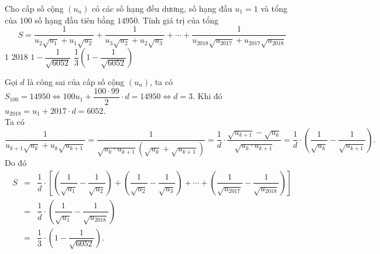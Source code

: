 \begin{ex}%
	Cho cấp số cộng $(u_n)$ có các số hạng đều dương, số hạng đầu $u_1=1$ và tổng của $100$ số hạng đầu tiên bằng $14950$. Tính giá trị của tổng $$ S= \dfrac{1}{u_2 \sqrt{u_1}+u_1\sqrt{u_2}}+\dfrac{1}{u_3\sqrt{u_2}+u_2 \sqrt{u_3}}+ \cdots + \dfrac{1}{u_{2018}\sqrt{u_{2017}}+u_{2017}\sqrt{u_{2018}}}$$
	\choice
	{$1$}
	{$2018$}
	{$1-\dfrac{1}{\sqrt{6052}}$}
	{\True $\dfrac{1}{3}\left( 1-\dfrac{1}{\sqrt{6052}}\right)$}
	\loigiai
	{ Gọi $d$ là công sai của cấp số cộng $(u_n)$, ta có $S_{100} =14950 \Leftrightarrow 100u_1+\dfrac{100\cdot 99}{2}\cdot d =14950 \Leftrightarrow d=3.$
		Khi đó $u_{2018}=u_1+2017\cdot d =6052$.\\
		Ta có $\dfrac{1}{u_{k+1}\sqrt{u_k}+u_k \sqrt{u_{k+1}}}= \dfrac{1}{\sqrt{u_k\cdot u_{k+1}} \left( \sqrt{u_k}+\sqrt{u_{k+1}}\right)}= \dfrac{1}{d} \cdot \dfrac{\sqrt{u_{k+1}}-\sqrt{u_k}}{\sqrt{u_k\cdot u_{k+1}}} =\dfrac{1}{d}\cdot \left( \dfrac{1}{\sqrt{u_k}} -\dfrac{1}{\sqrt{u_{k+1}}} \right).$\\
		Do đó 
		\begin{eqnarray*}
			S & = & \dfrac{1}{d}\cdot \left[ \left( \dfrac{1}{\sqrt{u_1}}- \dfrac{1}{\sqrt{u_2}}\right) +\left( \dfrac{1}{\sqrt{u_2}} -\dfrac{1}{\sqrt{u_3}}\right) + \cdots + 
			\left( \dfrac{1}{\sqrt{u_{2017}}} -\dfrac{1}{\sqrt{u_{2018}}}\right)\right] \\
			&= &  \dfrac{1}{d} \cdot \left( \dfrac{1}{\sqrt{u_1}} -\dfrac{1}{\sqrt{u_{2018}}}\right)\\
			&= & \dfrac{1}{3} \cdot \left( 1- \dfrac{1}{\sqrt{6052}}\right).
		\end{eqnarray*}
		

		
	}
\end{ex}

